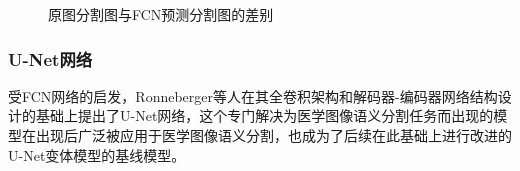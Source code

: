 \begin{figure}[htbp]
    \centering
    \caption{原图分割图与FCN预测分割图的差别\cite{shelhamer2016}}
    \label{fig:fcn_pre}
\end{figure}

\subsubsection{U-Net网络}

受FCN网络的启发，Ronneberger等人在其全卷积架构和解码器-编码器网络结构设计的基础上提出了U-Net网络，这个专门解决为医学图像语义分割任务而出现的模型在出现后广泛被应用于医学图像语义分割，也成为了后续在此基础上进行改进的U-Net变体模型的基线模型。

